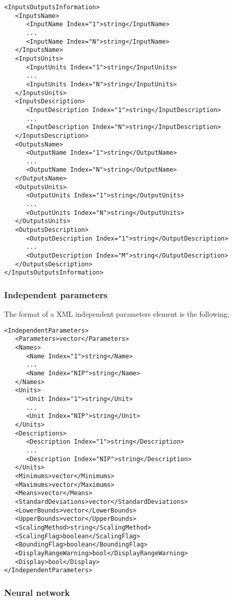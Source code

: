 \begin{lstlisting}
<InputsOutputsInformation>
   <InputsName>
      <InputName Index="1">string</InputName>
      ...
      <InputName Index="N">string</InputName>   
   </InputsName>
   <InputsUnits>
      <InputUnits Index="1">string</InputUnits>
      ...
      <InputUnits Index="N">string</InputUnits>   
   </InputsUnits>
   <InputsDescription>
      <InputDescription Index="1">string</InputDescription>
      ...
      <InputDescription Index="N">string</InputDescription>   
   </InputsDescription>
   <OutputsName>
      <OutputName Index="1">string</OutputName>
      ...
      <OutputName Index="N">string</OutputName>   
   </OutputsName>
   <OutputsUnits>
      <OutputUnits Index="1">string</OutputUnits>
      ...
      <OutputUnits Index="N">string</OutputUnits>   
   </OutputsUnits>
   <OutputsDescription>
      <OutputDescription Index="1">string</OutputDescription>
      ...
      <OutputDescription Index="M">string</OutputDescription>   
   </OutputsDescription>
</InputsOutputsInformation>
\end{lstlisting}

\subsubsection*{Independent parameters}

The format of a XML independent parameters element is the following,

\begin{lstlisting}
<IndependentParameters>
   <Parameters>vector</Parameters>
   <Names> 
      <Name Index="1">string</Name>
      ...
      <Name Index="NIP">string</Name>   
   </Names> 
   <Units> 
      <Unit Index="1">string</Unit>
      ...
      <Unit Index="NIP">string</Unit>   
   </Units> 
   <Descriptions> 
      <Description Index="1">string</Description>
      ...
      <Description Index="NIP">string</Description>   
   </Units> 
   <Minimums>vector</Minimums>
   <Maximums>vector</Maximums>
   <Means>vector</Means>
   <StandardDeviations>vector</StandardDeviations>
   <LowerBounds>vector</LowerBounds>
   <UpperBounds>vector</UpperBounds>
   <ScalingMethod>string</ScalingMethod>
   <ScalingFlag>boolean</ScalingFlag>
   <BoundingFlag>boolean</BoundingFlag>
   <DisplayRangeWarning>bool</DisplayRangeWarning>
   <Display>bool</Display>
</IndependentParameters>
\end{lstlisting}


\subsubsection*{Neural network}

